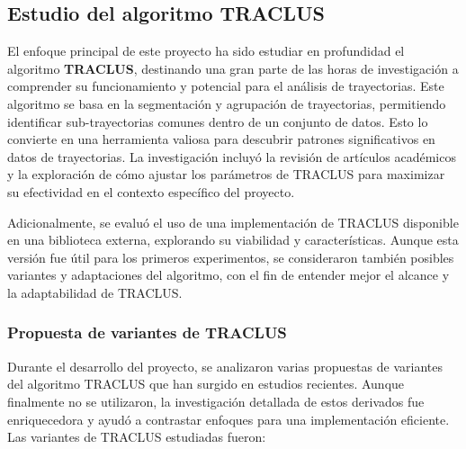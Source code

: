 \subsection{Estudio del algoritmo TRACLUS}

El enfoque principal de este proyecto ha sido estudiar en profundidad el algoritmo \textbf{TRACLUS}, destinando una gran parte de las horas de investigación a comprender su funcionamiento y potencial para el análisis de trayectorias. Este algoritmo se basa en la segmentación y agrupación de trayectorias, permitiendo identificar sub-trayectorias comunes dentro de un conjunto de datos. Esto lo convierte en una herramienta valiosa para descubrir patrones significativos en datos de trayectorias. La investigación incluyó la revisión de artículos académicos y la exploración de cómo ajustar los parámetros de TRACLUS para maximizar su efectividad en el contexto específico del proyecto.

Adicionalmente, se evaluó el uso de una implementación de TRACLUS disponible en una biblioteca externa, explorando su viabilidad y características. Aunque esta versión fue útil para los primeros experimentos, se consideraron también posibles variantes y adaptaciones del algoritmo, con el fin de entender mejor el alcance y la adaptabilidad de TRACLUS.

\subsubsection{Propuesta de variantes de TRACLUS}

Durante el desarrollo del proyecto, se analizaron varias propuestas de variantes del algoritmo TRACLUS que han surgido en estudios recientes. Aunque finalmente no se utilizaron, la investigación detallada de estos derivados fue enriquecedora y ayudó a contrastar enfoques para una implementación eficiente. Las variantes de TRACLUS estudiadas fueron:

